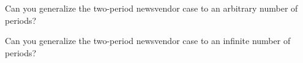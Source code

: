 \begin{exercise}
Can you generalize the two-period newsvendor case to an arbitrary number of periods?
   \begin{comment}
     TBD.
   \end{comment}
\end{exercise}

\begin{exercise}
Can you generalize the two-period newsvendor case to an infinite number of periods?
   \begin{comment}
     TBD.
   \end{comment}
\end{exercise}


